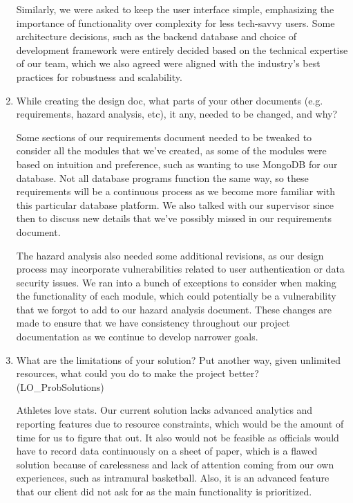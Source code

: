 \documentclass[12pt, titlepage]{article}
\begin{document}
\begin{enumerate}
  Similarly, we were asked to keep the user interface simple, emphasizing the importance of functionality over complexity for less tech-savvy users. Some architecture decisions, such as the backend database and choice of development framework were entirely decided based on the technical expertise of our team, which we also agreed were aligned with the industry’s best practices for robustness and scalability.

  \item While creating the design doc, what parts of your other documents (e.g.
        requirements, hazard analysis, etc), it any, needed to be changed, and why?

  Some sections of our requirements document needed to be tweaked to consider all the modules that we’ve created, as some of the modules were based on intuition and preference, such as wanting to use MongoDB for our database. Not all database programs function the same way, so these requirements will be a continuous process as we become more familiar with this particular database platform. We also talked with our supervisor since then to discuss new details that we’ve possibly missed in our requirements document. 

  The hazard analysis also needed some additional revisions, as our design process may incorporate vulnerabilities related to user authentication or data security issues. We ran into a bunch of exceptions to consider when making the functionality of each module, which could potentially be a vulnerability that we forgot to add to our hazard analysis document. These changes are made to ensure that we have consistency throughout our project documentation as we continue to develop narrower goals.

  \item What are the limitations of your solution?  Put another way, given
        unlimited resources, what could you do to make the project better? (LO\_ProbSolutions)

  Athletes love stats. Our current solution lacks advanced analytics and reporting features due to resource constraints, which would be the amount of time for us to figure that out. It also would not be feasible as officials would have to record data continuously on a sheet of paper, which is a flawed solution because of carelessness and lack of attention coming from our own experiences, such as intramural basketball. Also, it is an advanced feature that our client did not ask for as the main functionality is prioritized. 


\end{enumerate}
\end{document}
